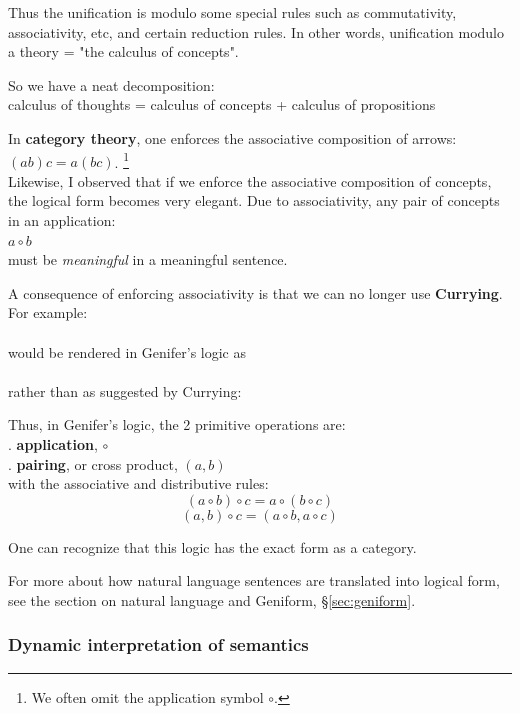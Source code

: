 Thus the unification is modulo some special rules such as commutativity, associativity, etc, and certain reduction rules.  In other words, unification modulo a theory = "the calculus of concepts".

So we have a neat decomposition:\\
\tab calculus of thoughts = calculus of concepts + calculus of propositions

In \textbf{category theory}, one enforces the associative composition of arrows:\\
\tab $(ab)c = a(bc)$. \footnote{We often omit the application symbol $\circ$.}\\
Likewise, I observed that if we enforce the associative composition of concepts, the logical form becomes very elegant.  Due to associativity, any pair of concepts in an application:\\
\tab $a \circ b$\\
must be \textit{meaningful} in a meaningful sentence.

A consequence of enforcing associativity is that we can no longer use \textbf{Currying}.  For example:\\
\tab {}\\
would be rendered in Genifer's logic as\\
\tab {}\\
rather than as suggested by Currying:\\
\tab {}

Thus, in Genifer's logic, the 2 primitive operations are:\\
. \textbf{application}, $\circ$\\
. \textbf{pairing}, or cross product, $(a,b)$\\
with the associative and distributive rules:
$$ (a \circ b) \circ c = a \circ (b \circ c) $$
$$ (a, b) \circ c = (a \circ b, a \circ c)$$

One can recognize that this logic has the exact form as a category.  

For more about how natural language sentences are translated into logical form, see the section on natural language and Geniform, \S\ref{sec:geniform}.

\subsubsection{Dynamic interpretation of semantics}

